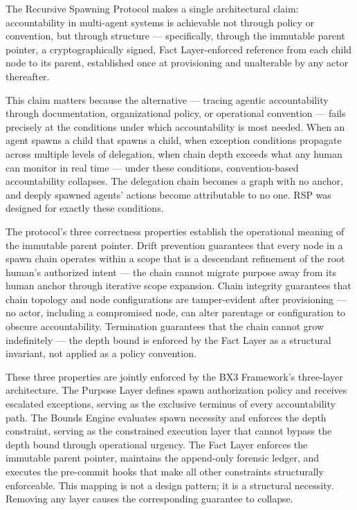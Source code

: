 The Recursive Spawning Protocol makes a single architectural claim: accountability in multi-agent systems is achievable not through policy or convention, but through structure — specifically, through the immutable parent pointer, a cryptographically signed, Fact Layer-enforced reference from each child node to its parent, established once at provisioning and unalterable by any actor thereafter.

This claim matters because the alternative — tracing agentic accountability through documentation, organizational policy, or operational convention — fails precisely at the conditions under which accountability is most needed. When an agent spawns a child that spawns a child, when exception conditions propagate across multiple levels of delegation, when chain depth exceeds what any human can monitor in real time — under these conditions, convention-based accountability collapses. The delegation chain becomes a graph with no anchor, and deeply spawned agents' actions become attributable to no one. RSP was designed for exactly these conditions.

The protocol's three correctness properties establish the operational meaning of the immutable parent pointer. Drift prevention guarantees that every node in a spawn chain operates within a scope that is a descendant refinement of the root human's authorized intent — the chain cannot migrate purpose away from its human anchor through iterative scope expansion. Chain integrity guarantees that chain topology and node configurations are tamper-evident after provisioning — no actor, including a compromised node, can alter parentage or configuration to obscure accountability. Termination guarantees that the chain cannot grow indefinitely — the depth bound is enforced by the Fact Layer as a structural invariant, not applied as a policy convention.

These three properties are jointly enforced by the BX3 Framework's three-layer architecture. The Purpose Layer defines spawn authorization policy and receives escalated exceptions, serving as the exclusive terminus of every accountability path. The Bounds Engine evaluates spawn necessity and enforces the depth constraint, serving as the constrained execution layer that cannot bypass the depth bound through operational urgency. The Fact Layer enforces the immutable parent pointer, maintains the append-only forensic ledger, and executes the pre-commit hooks that make all other constraints structurally enforceable. This mapping is not a design pattern; it is a structural necessity. Removing any layer causes the corresponding guarantee to collapse.

